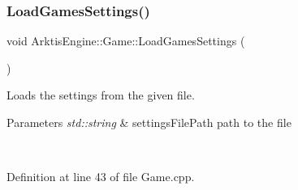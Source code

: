 \subsubsection{\texorpdfstring{LoadGamesSettings()}{LoadGamesSettings()}}
{\footnotesize\ttfamily void Arktis\+Engine\+::\+Game\+::\+Load\+Games\+Settings (\begin{DoxyParamCaption}{ }\end{DoxyParamCaption})}



Loads the settings from the given file. 


\begin{DoxyParams}{Parameters}
{\em std\+::string} & settings\+File\+Path path to the file \begin{DoxyVerb}\end{DoxyVerb}
 \\
\hline
\end{DoxyParams}


Definition at line 43 of file Game.\+cpp.


